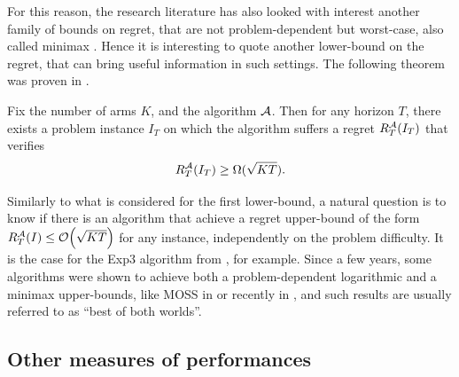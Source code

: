 For this reason, the research literature has also looked with interest another family of bounds on regret, that are not problem-dependent but worst-case, also called minimax \cite{Audibert2009minimax,audibert2010minimax}.
Hence it is interesting to quote another lower-bound on the regret, that can bring useful information in such settings.
The following theorem was proven in \cite{Auer02NonStochastic}.

\begin{theorem}\label{thm:2:worstCaseLowerBound}
    Fix the number of arms $K$, and the algorithm $\mathcal{A}$.
    Then for any horizon $T$, there exists a problem instance $I_T$ on which the algorithm suffers a regret $R_T^{\mathcal{A}}(I_T)$ that verifies
    \begin{equation}
        R_T^{\mathcal{A}}(I_T) \geq \Omega(\sqrt{K T}).
    \end{equation}
\end{theorem}


Similarly to what is considered for the first lower-bound,
a natural question is to know if there is an algorithm that achieve a regret upper-bound of the form $R_T^{\mathcal{A}}(I) \leq \mathop{}\mathopen{}\mathcal{O}\mathopen{}\left(\sqrt{K T}\right)$ for any instance, independently on the problem difficulty.
It is the case for the Exp3 algorithm from \cite{Auer02}, for example.
Since a few years, some algorithms were shown to achieve both a problem-dependent logarithmic and a minimax upper-bounds,
like MOSS in \cite{Audibert2009minimax} or recently \KLUCBpp{} in \cite{Menard17},
and such results are usually referred to as ``best of both worlds''.





\subsection{Other measures of performances}


